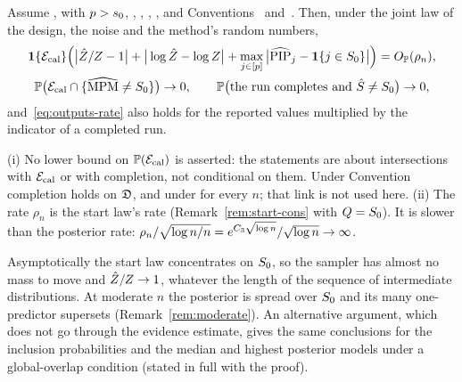 
\begin{theorem}\label{thm:outputs}
Assume ,  with $p>s_0$, , , , , and Conventions~ and~. Then,
under the joint law of the design, the noise and the method's random numbers,
\begin{gather}
  \mathbf{1}\{\mathcal E_{\mathrm{cal}}\}\Big(\big|\hat Z/Z-1\big|+\big|\log\hat Z-\log Z\big|+\max_{j\in[p]}\big|\widehat{\mathrm{PIP}}_j-\mathbf{1}\{j\in S_0\}\big|\Big)
    =O_{\mathbb{P}}(\rho_n),\label{eq:outputs-rate}\\
  \mathbb{P}\big(\mathcal E_{\mathrm{cal}}\cap\{\widehat{\mathrm{MPM}}\neq S_0\}\big)\to0,\qquad \mathbb{P}\big(\text{the run completes and }\hat S\neq S_0\big)\to0,
    \label{eq:outputs-sel}
\end{gather}
and~\eqref{eq:outputs-rate} also holds for the reported values multiplied by the indicator of a completed run.
\end{theorem}


\begin{remark}\label{rem:outputs}
(i) No lower bound on $\mathbb{P}(\mathcal E_{\mathrm{cal}})$ is asserted: the statements are about intersections with $\mathcal E_{\mathrm{cal}}$ or with completion, not
conditional on them. Under Convention~ completion holds on $\mathfrak D$, and under  for every $n$; that link is
not used here.
(ii) The rate $\rho_n$ is the start law's rate (Remark~\ref{rem:start-cons} with $Q=S_0$). It is slower than the posterior
rate: $\rho_n/\sqrt{\log n/n}=e^{C_3\sqrt{\log n}}/\sqrt{\log n}\to\infty$.
\end{remark}

\begin{remark}\label{rem:outputs-moderate}
Asymptotically the start law concentrates on $S_0$, so the sampler has almost no mass to move and $\hat Z/Z\to1$, whatever
the length of the sequence of intermediate distributions. At moderate $n$ the posterior is spread over $S_0$ and its many
one-predictor supersets (Remark~\ref{rem:moderate}). An alternative argument, which does not go through the evidence estimate, gives the same
conclusions for the inclusion probabilities and the median and highest posterior models under a global-overlap
condition (stated in full with the proof).
\end{remark}

